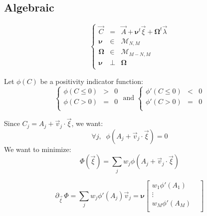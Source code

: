 \documentclass[aps,onecolumn,11pt]{revtex4}
\begin{document}
\subsection{Algebraic}

\begin{equation}
\left\lbrace
\begin{array}{rcl}
	\vec{C} & = & \vec{A} +\bm{\nu}^t \vec{\xi} + \bm{\Omega}^t\vec{\lambda}\\
	\bm{\nu}    & \in & \mathcal{M}_{N,M} \\
	\bm{\Omega} & \in & \mathcal{M}_{M-N,M}\\
	\bm{\nu}    & \perp & \bm{\Omega} \\
\end{array}
\right.
\end{equation}

Let $\phi(C)$ be a positivity indicator function:
\begin{equation}
\left\lbrace
\begin{array}{rcl}
	\phi(C\leq0) & > & 0\\
	\phi(C>0)    & = & 0\\
\end{array}
\right.
\text{ and }
\left\lbrace
\begin{array}{rcl}
	\phi'(C\leq0) & < & 0\\
	\phi'(C>0)    & = & 0\\
\end{array}
\right.
\end{equation}


Since $C_j = A_j + \vec{v}_j \cdot \vec{\xi}$, we want:
\begin{equation}
	\forall j, \;\; \phi\left(A_j+\vec{v}_j \cdot \vec{\xi}\right) = 0
\end{equation}
We want to minimize:
\begin{equation}
	\Phi\left(\vec{\xi}\right) = \sum_{j} w_j \phi\left(A_j+\vec{v}_j \cdot \vec{\xi}\right)
\end{equation}

\begin{equation}
\partial_{\vec{\xi}}\,\Phi =  \sum_{j} w_j \phi'(A_j) \vec{v}_j = 
\bm{\nu}
\begin{bmatrix}
	w_1 \phi'(A_1)  \\
    \vdots & \\
   w_M \phi'(A_M)  \\
\end{bmatrix}
\end{equation}

  
\end{document}
